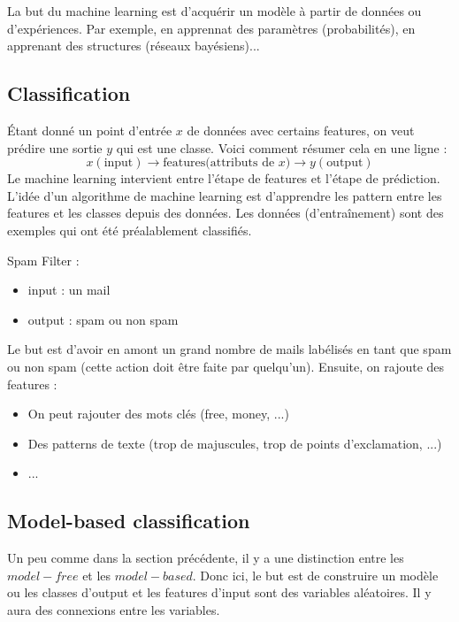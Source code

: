 La but du machine learning est d'acquérir un modèle à partir de données ou d'expériences. Par exemple, en apprennat des 
paramètres (probabilités), en apprenant des structures (réseaux bayésiens)...

\subsection{Classification}
\label{sub:classification}
Étant donné un point d'entrée $x$ de données avec certains features, on veut prédire une sortie $y$ qui est une classe. Voici
comment résumer cela en une ligne :
\begin{equation*}
    x(\text{input}) \rightarrow \text{features(attributs de }x) \rightarrow y(\text{output})
\end{equation*}
Le machine learning intervient entre l'étape de features et l'étape de prédiction. L'idée d'un algorithme de machine learning
est d'apprendre les pattern entre les features et les classes depuis des données. Les données (d'entraînement) sont des exemples
qui ont été préalablement classifiés.
\begin{example}
    Spam Filter :
    \begin{itemize}[label=\textbullet]
        \item input : un mail
        \item output : spam ou non spam
    \end{itemize}
    Le but est d'avoir en amont un grand nombre de mails labélisés en tant que spam ou non spam (cette action doit être faite par
    quelqu'un). Ensuite, on rajoute des features :
    \begin{itemize}[label=\textbullet]
        \item On peut rajouter des mots clés (free, money, ...)
        \item Des patterns de texte (trop de majuscules, trop de points d'exclamation, ...)
        \item ...
    \end{itemize}
\end{example}

\subsection{Model-based classification}
\label{sub:model_based_classification}
Un peu comme dans la section précédente, il y a une distinction entre les $model-free$ et les $model-based$. Donc ici, le but
est de construire un modèle ou les classes d'output et les features d'input sont des variables aléatoires. Il y aura des 
connexions entre les variables. 

